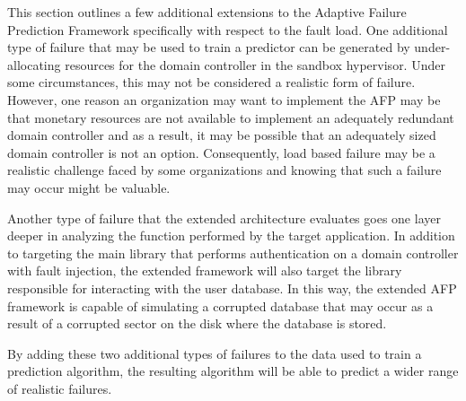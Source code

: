 This section outlines a few additional extensions to the Adaptive Failure
Prediction Framework specifically with respect to the fault load.  One
additional type of failure that may be used to train a predictor can be
generated by under-allocating resources for the domain controller in the
sandbox hypervisor.  Under some circumstances, this may not be considered a
realistic form of failure.  However, one reason an organization may want to
implement the AFP may be that monetary resources are not available to implement
an adequately redundant domain controller and as a result, it may be possible
that an adequately sized domain controller is not an option.  Consequently,
load based failure may be a realistic challenge faced by some organizations and
knowing that such a failure may occur might be valuable.

Another type of failure that the extended architecture evaluates goes one layer
deeper in analyzing the function performed by the target application.  In
addition to targeting the main library that performs authentication on a domain
controller with fault injection, the extended framework will also target the
library responsible for interacting with the user database.  In this way, the
extended AFP framework is capable of simulating a corrupted database that may
occur as a result of a corrupted sector on the disk where the database is
stored.

By adding these two additional types of failures to the data used to train a
prediction algorithm, the resulting algorithm will be able to predict a wider
range of realistic failures.
